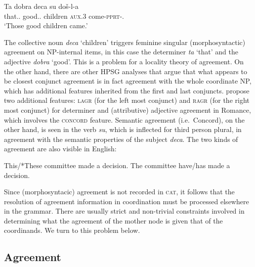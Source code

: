 \documentclass[output=paper
                ,modfonts
                ,nonflat
	        ,collection
	        ,collectionchapter
	        ,collectiontoclongg
 	        ,biblatex
                ,babelshorthands
                ,newtxmath
                ,draftmode
                ,colorlinks, citecolor=brown
]{./langsci/langscibook}
\begin{document}
{\begin{exe}
\ex \gll Ta dobra deca su do\v{s}-l-a\\
         that.\sg.\fem{} good.\sg.\fem{} children \textsc{aux}.3\pl{} come-\textsc{pprt}-\neu.\pl\\
  \glt `Those good children came.'  \citep[51]{wechsler} 
\end{exe}

\noindent
The collective noun \emph{deca} `children' triggers feminine singular (morphosyntactic) agreement on NP-internal items, in this case the determiner \emph{ta} `that' and the adjective \emph{dobra} `good'.   This is a problem for a locality theory of agreement. On the other hand, there are other HPSG analyses that argue that what appears to be closest conjunct agreement is in fact agreement with the whole coordinate NP, which has additional features inherited from the first and last conjuncts. \citet[Section~5]{Villavicencio:Sadler:ea:05} propose two additional features: \textsc{lagr} (for the left most conjunct) and \textsc{ragr} (for the right most conjunct) for determiner and (attributive) adjective agreement in Romance, which involves the \textsc{concord} feature.
Semantic agreement (i.e.\ Concord), on the other hand, is seen in the verb \emph{su}, which  is inflected for third person plural, in agreement with the semantic properties of the subject \emph{deca}. The two kinds of agreement are also visible in
English:

\begin{exe}
\ex
\begin{xlista}
\ex This/*These committee made a decision.
\ex The committee have/has made a decision.
\end{xlista}
\end{exe}


\noindent
Since (morphosyntacic) agreement is not recorded in \textsc{cat}, it follows that the resolution of agreement information in coordination must be processed elsewhere in the grammar. There are usually strict and non-trivial constraints involved in determining what the agreement of the mother node is given that of the coordinands. We turn to this problem below.







\subsection{Agreement}


}
\end{document}
